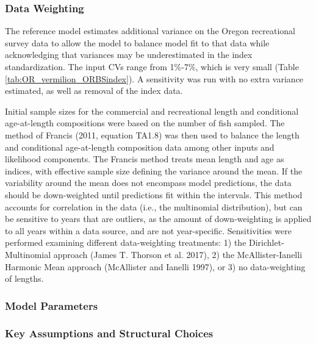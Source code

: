 \documentclass[11pt,
  english,
  letterpaper,
]{article}
\begin{document}
\hypertarget{data-weighting}{%
\subsubsection{Data Weighting}\label{data-weighting}}

The reference model estimates additional variance on the Oregon recreational survey data to allow the model to balance model fit to that data while acknowledging that variances may be underestimated in the index standardization. The input CVs range from 1\%-7\%, which is very small (Table \ref{tab:OR_vermilion_ORBSindex}). A sensitivity was run with no extra variance estimated, as well as removal of the index data.

Initial sample sizes for the commercial and recreational length and conditional age-at-length compositions were based on the number of fish sampled. The method of Francis (2011, equation TA1.8) was then used to balance the length and conditional age-at-length composition data among other inputs and likelihood components. The Francis method treats mean length and age as indices, with effective sample size defining the variance around the mean. If the variability around the mean does not encompass model predictions, the data should be down-weighted until predictions fit within the intervals. This method accounts for correlation in the data (i.e., the multinomial distribution), but can be sensitive to years that are outliers, as the amount of down-weighting is applied to all years within a data source, and are not year-specific. Sensitivities were performed examining different data-weighting treatments: 1) the Dirichlet-Multinomial approach (James T. Thorson et al. 2017), 2) the McAllister-Ianelli Harmonic Mean approach (McAllister and Ianelli 1997), or 3) no data-weighting of lengths.

\hypertarget{model-parameters}{%
\subsubsection{Model Parameters}\label{model-parameters}}

\hypertarget{key-assumptions-and-structural-choices}{%
\subsubsection{Key Assumptions and Structural Choices}\label{key-assumptions-and-structural-choices}}
\end{document}
